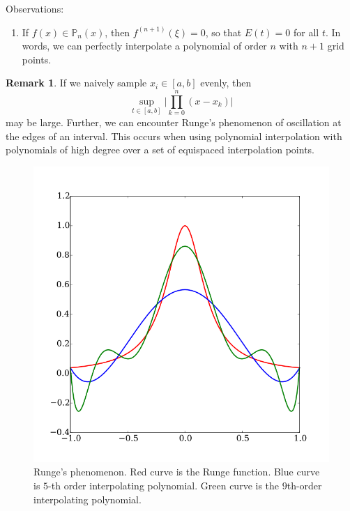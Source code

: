 \documentclass[12pt]{article}
\theoremstyle{definition}
\newtheorem{remark}{Remark}
\theoremstyle{definition}
\begin{document}
Observations:
\begin{enumerate}
	\item If $f(x) \in \mathbb{P}_{n}(x)$, then $f^{(n+1)}(\xi) = 0$, so that $E(t) = 0$ for all $t$. In words, we can perfectly interpolate a polynomial of order $n$ with $n+1$ grid points.
\end{enumerate}

\begin{remark}
	If we naively sample $x_i \in [a,b]$ evenly, then 
	\begin{equation}
		\sup_{t \in [a,b]} \bigg\lvert \prod_{k=0}^n (x-x_k) \bigg\rvert
	\end{equation}
	may be large. Further, we can encounter Runge's phenomenon of oscillation at the edges of an interval. This occurs when using polynomial interpolation with polynomials of high degree over a set of equispaced interpolation points. 
	\begin{figure}[H]
	\begin{center}
		\includegraphics[scale=.4]{runge_phenomenon.png}
	\end{center}
	\caption{Runge's phenomenon. Red curve is the Runge function. Blue curve is $5$-th order interpolating polynomial. Green curve is the $9$th-order interpolating polynomial.}
\end{figure}
\end{remark}
\end{document}

